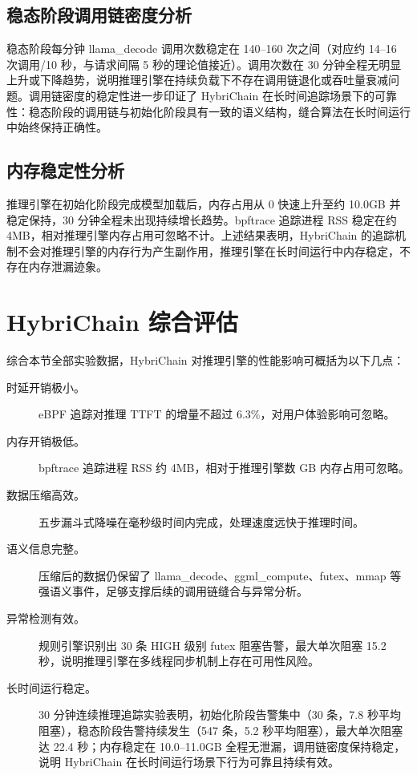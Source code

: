 \subsection{稳态阶段调用链密度分析}

稳态阶段每分钟 llama\_decode 调用次数稳定在 140–160 次之间（对应约 14–16 次调用/10 秒，与请求间隔 5 秒的理论值接近）。调用次数在 30 分钟全程无明显上升或下降趋势，说明推理引擎在持续负载下不存在调用链退化或吞吐量衰减问题。调用链密度的稳定性进一步印证了 HybriChain 在长时间追踪场景下的可靠性：稳态阶段的调用链与初始化阶段具有一致的语义结构，缝合算法在长时间运行中始终保持正确性。

\subsection{内存稳定性分析}

推理引擎在初始化阶段完成模型加载后，内存占用从 0 快速上升至约 10.0GB 并稳定保持，30 分钟全程未出现持续增长趋势。bpftrace 追踪进程 RSS 稳定在约 4MB，相对推理引擎内存占用可忽略不计。上述结果表明，HybriChain 的追踪机制不会对推理引擎的内存行为产生副作用，推理引擎在长时间运行中内存稳定，不存在内存泄漏迹象。

\section{HybriChain 综合评估}

综合本节全部实验数据，HybriChain 对推理引擎的性能影响可概括为以下几点：

\begin{description}
    \item[时延开销极小。] eBPF 追踪对推理 TTFT 的增量不超过 6.3\%，对用户体验影响可忽略。
    \item[内存开销极低。] bpftrace 追踪进程 RSS 约 4MB，相对于推理引擎数 GB 内存占用可忽略。
    \item[数据压缩高效。] 五步漏斗式降噪在毫秒级时间内完成，处理速度远快于推理时间。
    \item[语义信息完整。] 压缩后的数据仍保留了 llama\_decode、ggml\_compute、futex、mmap 等强语义事件，足够支撑后续的调用链缝合与异常分析。
    \item[异常检测有效。] 规则引擎识别出 30 条 HIGH 级别 futex 阻塞告警，最大单次阻塞 15.2 秒，说明推理引擎在多线程同步机制上存在可用性风险。
    \item[长时间运行稳定。] 30 分钟连续推理追踪实验表明，初始化阶段告警集中（30 条，7.8 秒平均阻塞），稳态阶段告警持续发生（547 条，5.2 秒平均阻塞），最大单次阻塞达 22.4 秒；内存稳定在 10.0–11.0GB 全程无泄漏，调用链密度保持稳定，说明 HybriChain 在长时间运行场景下行为可靠且持续有效。
\end{description}

